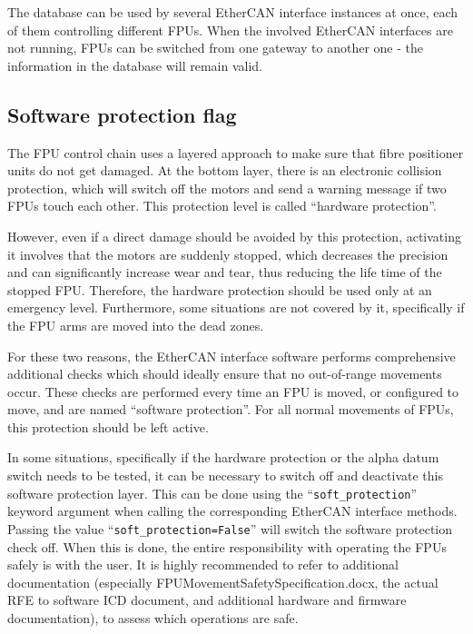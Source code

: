 \documentclass[11pt,a4paper]{scrartcl}
\begin{document}
The database can be used by several EtherCAN interface instances at once, each of
them controlling different FPUs. When the involved EtherCAN interfaces are not
running, FPUs can be switched from one gateway to another one - the
information in the database will remain valid.

\subsection{Software protection flag}
\label{sec:protectionintro}
The FPU control chain uses a layered approach to make sure that fibre
positioner units do not get damaged.  At the bottom layer, there is an
electronic collision protection, which will switch off the motors and
send a warning message if two FPUs touch each other. This protection
level is called ``hardware protection''.

 

However, even if a direct damage should be avoided by this protection,
activating it involves that the motors are suddenly stopped, which
decreases the precision and can significantly increase wear and tear,
thus reducing the life time of the stopped FPU. Therefore, the
hardware protection should be used only at an emergency
level. Furthermore, some situations are not covered by it,
specifically if the FPU arms are moved into the dead zones.

For these two reasons, the EtherCAN interface software performs comprehensive
additional checks which should ideally ensure that no out-of-range
movements occur. These checks are performed every time an FPU is
moved, or configured to move, and are named ``software protection''.
For all normal movements of FPUs, this protection should be left
active.

In some situations, specifically if the hardware protection or the
alpha datum switch needs to be tested, it can be necessary to switch
off and deactivate this software protection layer. This can be done
using the ``\texttt{soft\_protection}'' keyword argument when calling
the corresponding EtherCAN interface methods. Passing the value
``\texttt{soft\_protection=False}'' will switch the software
protection check off. When this is done, the entire responsibility
with operating the FPUs safely is with the user. It is highly
recommended to refer to additional documentation (especially
FPUMovementSafetySpecification.docx, the actual RFE to software ICD
document, and additional hardware and firmware documentation), to
assess which operations are safe.
\end{document}
